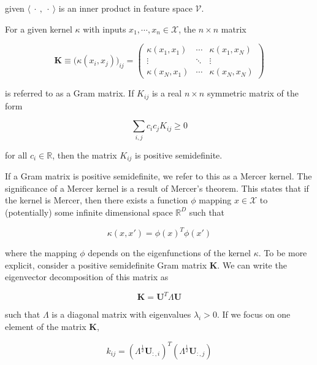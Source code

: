 \documentclass[12pt]{article}
\begin{document}
given $\langle \ \cdot \ ,\ \cdot \ \rangle$ is an inner product in feature space $\mathcal{V}$.

For a given kernel $\kappa$ with inputs $x_1,\cdots,x_n\in\mathcal{X}$, the $n\times n$ matrix 

\begin{equation}
\textbf{K}\equiv\big(\kappa(x_i, x_j)\big)_{ij}=\begin{pmatrix}
\kappa(x_1, x_1) & \cdots & \kappa(x_1, x_N) \\ 
\vdots & \ddots & \vdots\\
\kappa(x_N, x_1) & \cdots & \kappa(x_N, x_N)\end{pmatrix}
\end{equation}

is referred to as a Gram matrix. If $K_{ij}$ is a real $n\times n$ symmetric matrix of the form 

\begin{equation}
\sum\limits_{i,j}c_ic_jK_{ij}\geq0
\end{equation}

for all $c_i\in\mathbb{R}$, then the matrix $K_{ij}$ is positive semidefinite.

If a Gram matrix is positive semidefinite, we refer to this as a Mercer kernel. The significance of a Mercer kernel is a result of Mercer's theorem. This states that if the kernel is Mercer, then there exists a function $\phi$ mapping $x\in\mathcal{X}$ to (potentially) some infinite dimensional space $\mathbb{R}^D$ such that

\begin{equation}
\kappa(x,x')=\phi(x)^{T}\phi(x')
\end{equation}

where the mapping $\phi$ depends on the eigenfunctions of the kernel $\kappa$. To be more explicit, consider a positive semidefinite Gram matrix $\textbf{K}$. We can write the eigenvector decomposition of this matrix as

\begin{equation}
\textbf{K}=\textbf{U}^{T}\Lambda\textbf{U}
\end{equation}

such that $\Lambda$ is a diagonal matrix with eigenvalues $\lambda_i>0$. If we focus on one element of the matrix $\textbf{K}$,

\begin{equation}
k_{ij}=(\Lambda^{\frac{1}{2}}\textbf{U}_{:,i})^{T}(\Lambda^{\frac{1}{2}}\textbf{U}_{:,j})
\end{equation}
\end{document}
